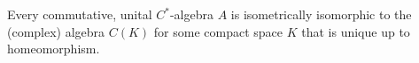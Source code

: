 Every commutative, unital $C^*$-algebra $A$ is isometrically isomorphic to the (complex) algebra $C(K)$ for some compact space $K$ that is unique up to homeomorphism.

